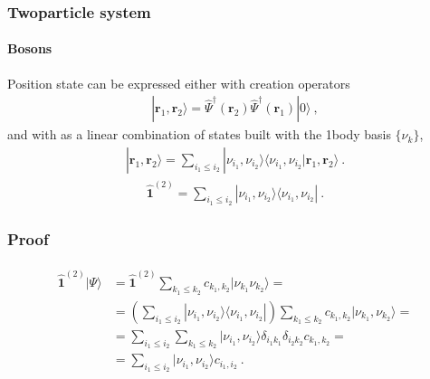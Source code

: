 \documentclass[letterpaper,10pt,english]{jupyterBook}
\begin{document}
\subsubsection{Two\sphinxhyphen{}particle system}
\label{\detokenize{ch/quantum-mechanics/many-body/quantum-fields:two-particle-system}}

\paragraph{Bosons}
\label{\detokenize{ch/quantum-mechanics/many-body/quantum-fields:bosons}}
\sphinxAtStartPar
Position state can be expressed either with creation operators
\begin{equation*}
\begin{split}| \mathbf{r}_1, \mathbf{r}_2 \rangle = \hat{\Psi}^\dagger(\mathbf{r}_2) \hat{\Psi}^\dagger(\mathbf{r}_1) | 0 \rangle \ ,\end{split}
\end{equation*}
\sphinxAtStartPar
and with as a linear combination of states built with the 1\sphinxhyphen{}body basis \(\{ \nu_k \}\),
\begin{equation*}
\begin{split}| \mathbf{r}_1, \mathbf{r}_2 \rangle = \sum_{i_1 \le i_2} | \nu_{i_1}, \nu_{i_2} \rangle \langle \nu_{i_1}, \nu_{i_2} | \mathbf{r}_1, \mathbf{r}_2 \rangle \ .\end{split}
\end{equation*}
\sphinxAtStartPar
{}
\begin{equation*}
\begin{split}\hat{\mathbf{1}}^{(2)} = \sum_{i_1 \le i_2} | \nu_{i_1}, \nu_{i_2} \rangle \langle \nu_{i_1}, \nu_{i_2} | \ .\end{split}
\end{equation*}\subsubsection*{Proof}
\begin{equation*}
\begin{split}\begin{aligned}
  \hat{\mathbf{1}}^{(2)} | \Psi \rangle 
  & = \hat{\mathbf{1}}^{(2)} \sum_{k_1 \le k_2} c_{k_1, k_2} | \nu_{k_1} \nu_{k_2} \rangle = \\
  & = \left( \sum_{i_1 \le i_2} | \nu_{i_1}, \nu_{i_2} \rangle \langle \nu_{i_1}, \nu_{i_2} | \right) \sum_{k_1 \le k_2} c_{k_1, k_2} | \nu_{k_1} , \nu_{k_2} \rangle = \\
  & = \sum_{i_1 \le i_2} \sum_{k_1 \le k_2} | \nu_{i_1}, \nu_{i_2} \rangle \delta_{i_1 k_1} \delta_{i_2 k_2} c_{k_1,k_2} = \\
  & = \sum_{i_1 \le i_2} | \nu_{i_1}, \nu_{i_2} \rangle c_{i_1,i_2} \ .
\end{aligned}\end{split}
\end{equation*}
\end{document}
